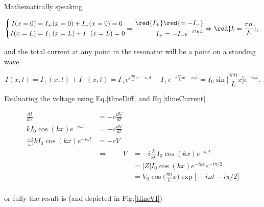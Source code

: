 Mathematically speaking

 \begin{equation}
   \left\lbrace \begin{aligned}
       I(x=0) & = I_{+}(x=0)+I_-(x=0)=0\\
       I(x=L) & = I_{+}(x=L)+I_-(x=L)=0
     \end{aligned}\Rightarrow\begin{aligned}
       \red{I_+}&\red{=-I_-}\\
       I_+&= -I_-e^{-i2kL}
     \end{aligned} \Rightarrow \red{k=\frac{\pi n}{L}}, \right.
 \end{equation}

 \noindent and the total current at  any point in the resonator will be
 a point on a standing wave

 \begin{equation}
   I(x,t) = I_+(x,t) + I_-(x,t) = I_+e^{i\frac{\pi n}{L}x-i\omega t} - I_+e^{-i\frac{\pi n}{L}x-i\omega t} = {{I_0\sin\bigg[\frac{\pi n}{L}x\bigg]e^{-i\omega t}}}.
   \label{tlineCurrent}
 \end{equation}

 \noindent  Evaluating  the   voltage  using  Eq.\eqref{tlineDiff}  and
 Eq.\eqref{tlineCurrent}

 \begin{equation}
   \begin{aligned}
     \frac{dI}{dx} &= - c\frac{dV}{dt}\\
     kI_0\cos(kx)e^{-i\omega t}& =-c\frac{dV}{dt}\\
     \frac{-1}{i\omega}kI_0\cos(kx)e^{-i\omega t}& =-cV\\
     & \Rightarrow\qquad V &=  -i\frac{k}{\omega c}I_0\cos(kx)e^{-i\omega t}\\
     &&=|Z|I_0\cos(kx)e^{-i\omega t}e^{-i\pi/2}\\
     &&=V_0\cos \bigg(\frac{\pi n}{L}x\bigg)\exp\bigg[-i\omega t-i\pi/2\bigg]\\
   \end{aligned}
 \end{equation}

 \noindent or fully the result is (and depicted in Fig.\ref{tlineVI})


